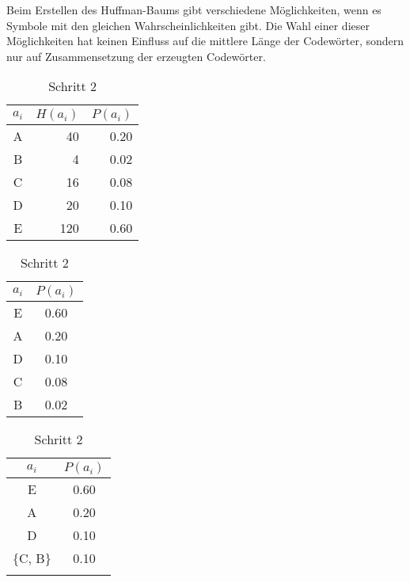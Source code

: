 \documentclass[twoside,11pt,a4paper]{article}
\theoremstyle{break}
\begin{document}
Beim Erstellen des Huffman-Baums gibt verschiedene Möglichkeiten, wenn
es Symbole mit den gleichen Wahrscheinlichkeiten gibt. Die Wahl einer
dieser Möglichkeiten hat keinen Einfluss auf die mittlere Länge der
Codewörter, sondern nur auf Zusammensetzung der erzeugten Codewörter.

\begin{table}[h]
\centering
\caption{Beispiel für eine Häufigkeitsverteilung}

\begin{subtable}[t]{0.3\textwidth}
  \centering
  \caption{Ausgangstabelle}
  \begin{tabular}{c|r|r}
    $a_i$ & $H(a_i)$ & $P(a_i)$ \\ \hline
    A & 40   & 0.20 \\
    B & 4    & 0.02 \\
    C & 16   & 0.08 \\
    D & 20   & 0.10 \\
    E & 120  & 0.60 \\
  \end{tabular}
  \vspace{3ex}
  \label{tab:HBEX0}
\end{subtable}
\begin{subtable}[t]{0.3\textwidth}
  \centering
  \caption{Schritt 1}
  \begin{tabular}{c|c}
    $a_i$ & $P(a_i)$ \\ \hline
    E & 0.60 \\
    A & 0.20 \\
    D & 0.10 \\
    C & 0.08 \\
    B & 0.02 \\
  \end{tabular}
  \vspace{3ex}
  \label{tab:HBEX1}
\end{subtable}
\begin{subtable}[t]{0.3\textwidth}
  \centering
  \caption{Schritt 2}
  \begin{tabular}{c|c}
    $a_i$ & $P(a_i)$ \\ \hline
    E & 0.60 \\
    A & 0.20 \\
    D & 0.10 \\
    \{C, B\} & 0.10 \\ \\
  \end{tabular}
  \vspace{3ex}
  \label{tab:HBEX2}

\end{subtable}
\end{table}
\end{document}
